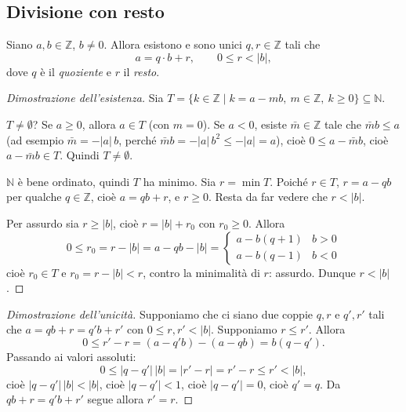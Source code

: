 \documentclass[11pt,a4paper]{article}
\begin{document}
\subsection{Divisione con resto}

\begin{proposizione}
Siano $a, b \in \mathbb{Z}$, $b \neq 0$. Allora esistono e sono unici $q, r \in \mathbb{Z}$ tali che
\[
  a = q\cdot b + r, \qquad 0 \le r < |b| ,
\]
dove $q$ è il \emph{quoziente} e $r$ il \emph{resto}.
\end{proposizione}

\begin{proof}[Dimostrazione dell'esistenza]
Sia $T = \{k \in \mathbb{Z} \mid k = a - mb,\ m \in \mathbb{Z},\ k \ge 0\} \subseteq \mathbb{N}$.

$T \neq \emptyset$? Se $a \ge 0$, allora $a \in T$ (con $m = 0$). Se $a < 0$, esiste $\bar m \in \mathbb{Z}$ tale che $\bar m b \le a$ (ad esempio $\bar m = -|a|\,b$, perché $\bar m b = -|a|\,b^2 \le -|a| = a$), cioè $0 \le a - \bar m b$, cioè $a - \bar m b \in T$. Quindi $T \neq \emptyset$.

$\mathbb{N}$ è bene ordinato, quindi $T$ ha minimo. Sia $r = \min T$. Poiché $r \in T$, $r = a - qb$ per qualche $q \in \mathbb{Z}$, cioè $a = qb + r$, e $r \ge 0$. Resta da far vedere che $r < |b|$.

Per assurdo sia $r \ge |b|$, cioè $r = |b| + r_0$ con $r_0 \ge 0$. Allora
\[
  0 \le r_0 = r - |b| = a - qb - |b| = \begin{cases} a - b(q + 1) & b > 0 \\ a - b(q - 1) & b < 0 \end{cases}
\]
cioè $r_0 \in T$ e $r_0 = r - |b| < r$, contro la minimalità di $r$: assurdo. Dunque $r < |b|$.
\end{proof}

\begin{proof}[Dimostrazione dell'unicità]
Supponiamo che ci siano due coppie $q, r$ e $q', r'$ tali che $a = qb + r = q'b + r'$ con $0 \le r, r' < |b|$. Supponiamo $r \le r'$. Allora
\[
  0 \le r' - r = (a - q'b) - (a - qb) = b(q - q') .
\]
Passando ai valori assoluti:
\[
  0 \le |q - q'|\,|b| = |r' - r| = r' - r \le r' < |b| ,
\]
cioè $|q - q'|\,|b| < |b|$, cioè $|q - q'| < 1$, cioè $|q - q'| = 0$, cioè $q' = q$. Da $qb + r = q'b + r'$ segue allora $r' = r$.
\end{proof}
\end{document}
